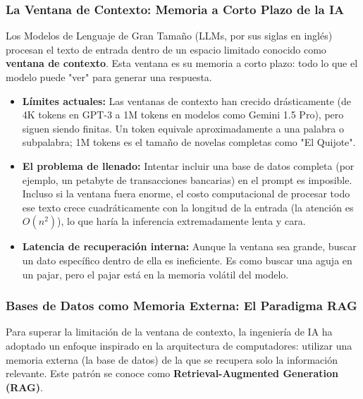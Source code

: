 \documentclass[12pt,a4paper,openany,oneside]{book}
\begin{document}
\subsubsection{La Ventana de Contexto: Memoria a Corto Plazo de la IA}
Los Modelos de Lenguaje de Gran Tamaño (LLMs, por sus siglas en inglés) procesan el texto de entrada dentro de un espacio limitado conocido como \textbf{ventana de contexto}. Esta ventana es su memoria a corto plazo: todo lo que el modelo puede "ver" para generar una respuesta.

\begin{itemize}
    \item \textbf{Límites actuales:} Las ventanas de contexto han crecido drásticamente (de 4K tokens en GPT-3 a 1M tokens en modelos como Gemini 1.5 Pro), pero siguen siendo finitas. Un token equivale aproximadamente a una palabra o subpalabra; 1M tokens es el tamaño de novelas completas como "El Quijote".
    \item \textbf{El problema de llenado:} Intentar incluir una base de datos completa (por ejemplo, un petabyte de transacciones bancarias) en el prompt es imposible. Incluso si la ventana fuera enorme, el costo computacional de procesar todo ese texto crece cuadráticamente con la longitud de la entrada (la atención es $O(n^2)$), lo que haría la inferencia extremadamente lenta y cara.
    \item \textbf{Latencia de recuperación interna:} Aunque la ventana sea grande, buscar un dato específico dentro de ella es ineficiente. Es como buscar una aguja en un pajar, pero el pajar está en la memoria volátil del modelo.
\end{itemize}

\subsubsection{Bases de Datos como Memoria Externa: El Paradigma RAG}
Para superar la limitación de la ventana de contexto, la ingeniería de IA ha adoptado un enfoque inspirado en la arquitectura de computadores: utilizar una memoria externa (la base de datos) de la que se recupera solo la información relevante. Este patrón se conoce como \textbf{Retrieval-Augmented Generation (RAG)}.
\end{document}
